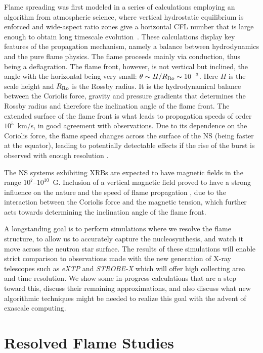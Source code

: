 \documentclass[a4paper]{jpconf}
\begin{document}
Flame spreading was first modeled in a series of calculations
employing an algorithm from atmospheric science, where vertical
hydrostatic equilibrium is enforced and wide-aspect ratio zones give a
horizontal CFL number that is large enough to obtain long timescale
evolution~\cite{cavecchi:2012}.
These calculations display key features of the propagation
mechanism, namely a balance between hydrodynamics and the pure
flame physics. The flame proceeds mainly via conduction, thus being a
deflagration. The flame front, however, is not vertical but inclined,
the angle with the horizontal being very small: $\theta \sim
H/R_{\rm{Ro}} \sim 10^{-3}$. Here $H$ is the scale height and
$R_{\rm{Ro}}$ is the Rossby radius. It is the hydrodynamical balance
between the Coriolis force, gravity and pressure gradients that
determines the Rossby radius and therefore the inclination angle of the
flame front. The extended surface of the flame front is what leads to
propagation speeds of order $10^5 $~km/s, in good agreement with
observations. Due to its dependence on the Coriolis force, the flame
speed changes across the surface of the NS (being faster at the
equator), leading to potentially detectable effects if the rise of the
burst is observed with enough resolution
\cite{art-2015-cavecchi-etal}.

The NS systems exhibiting XRBs are
expected to have magnetic fields in the range $10^7$--$10^{10}$~G.
Inclusion of a vertical magnetic field proved to have a strong
influence on the nature and the speed of flame propagation
\cite{art-2016-cavecchi-etal}, due to the interaction between the
Coriolis force and the magnetic tension, which further acts towards
determining the inclination angle of the flame front.

A longstanding goal is to perform simulations where we resolve the
flame structure, to allow us to accurately capture the
nucleosynthesis, and watch it move across the neutron star surface.
The results of these simulations will enable strict comparison to
observations made with the new generation of X-ray telescopes such as
\textit{eXTP}\/ and \textit{STROBE-X}\/
\cite{art-2017-wilhod-etal,art-2016-zhang-etal,intZand2018} which will offer
high collecting area and time resolution.
We show some in-progress calculations that are a step toward this, discuss
their remaining approximations, and also discuss what new algorithmic
techniques might be needed to realize this goal with the advent of
exascale computing.



\section{Resolved Flame Studies}
\end{document}
